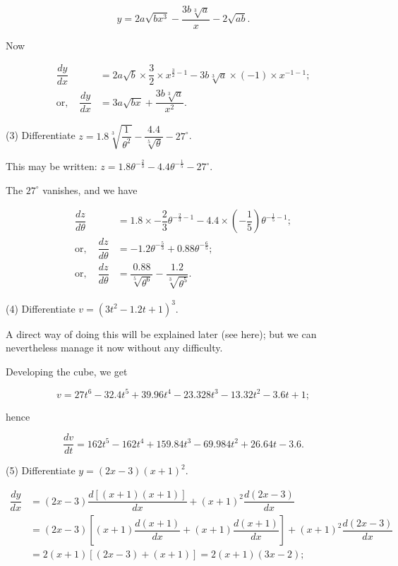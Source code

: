 \documentclass{ximera}
\begin{document}
$$
y=2a\sqrt{bx^3}−\dfrac{3b\sqrt[3]{a}}{x}−2\sqrt{ab}.
$$

Now

\begin{align*}
\dfrac{dy}{dx} &=2a\sqrt{b}\times\dfrac{3}{2}\times x^{\frac{3}{2}−1}−3b\sqrt[3]{a}\times(−1)\times x^{−1−1};\\
\text{or},\quad \dfrac{dy}{dx} &=3a\sqrt{bx}+\dfrac{3b\sqrt[3]{a}}{x^2}.
\end{align*}

\par\noindent
(3) Differentiate $z=1.8\sqrt[3]{\dfrac{1}{\theta^2}}−\dfrac{4.4}{\sqrt[5]{\theta}}−27^{\circ}$.


This may be written: $z=1.8\theta^{−\frac{2}{3}}−4.4\theta^{−\frac{1}{5}}−27^{\circ}$.


The $27^{\circ}$ vanishes, and we have

\begin{align*}
\dfrac{dz}{d\theta} &=1.8\times−\dfrac{2}{3}\theta^{−\frac{2}{3}−1}−4.4\times\left(−\dfrac{1}{5}\right)\theta^{−\frac{1}{5}−1};\\
\text{or},\quad\dfrac{dz}{d\theta} &=−1.2\theta^{−\frac{5}{3}}+0.88\theta^{−\frac{6}{5}};\\
\text{or},\quad \dfrac{dz}{d\theta} &=\dfrac{0.88}{\sqrt[5]{\theta^6}}−\dfrac{1.2}{\sqrt[3]{\theta^5}}.
\end{align*}

\par\noindent
(4)  Differentiate $v=(3t^2−1.2t+1)^3$.


A direct way of doing this will be explained later (see here); but we can nevertheless manage it now without 
any difficulty.

Developing the cube, we get

$$
v=27t^6−32.4t^5+39.96t^4−23.328t^3−13.32t^2−3.6t+1;
$$

hence

$$
\dfrac{dv}{dt}=162t^5−162t^4+159.84t^3−69.984t^2+26.64t−3.6.
$$

\par\noindent
(5) Differentiate  $y=(2x−3)(x+1)^2$.

\begin{align*}
\dfrac{dy}{dx} &=(2x−3)\dfrac{d[(x+1)(x+1)]}{dx}+(x+1)^2\dfrac{d(2x-3)}{dx}\\
 &=(2x−3)\left[(x+1)\dfrac{d(x+1)}{dx}+(x+1)\dfrac{d(x+1)}{dx}\right] + (x+1)^2\dfrac{d(2x-3)}{dx}\\
 &=2(x+1)[(2x−3)+(x+1)]=2(x+1)(3x−2);
\end{align*}
\end{document}
